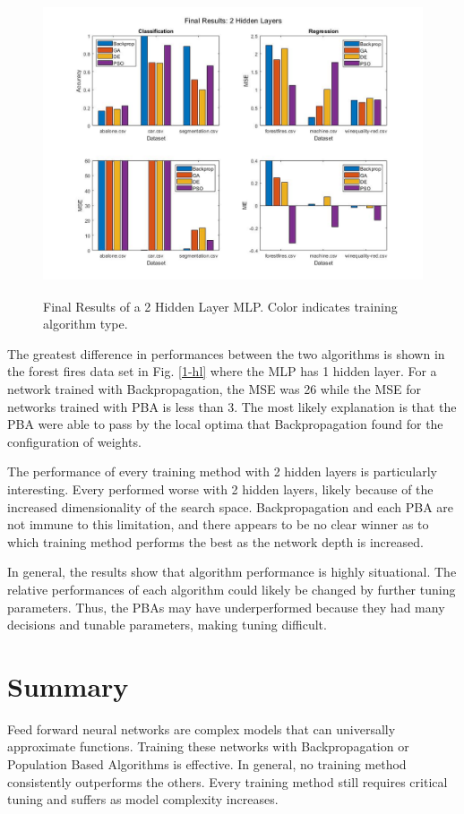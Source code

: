\documentclass[twoside,11pt]{article}
\begin{document}
	\begin{figure}[h]
		\centering
		\includegraphics[height=3.5in]{FINAL_FIGS/2_hl.jpg}
		\caption{Final Results of a 2 Hidden Layer MLP. Color indicates training algorithm type.}
		\label{2-hl}
	\end{figure}

	The greatest difference in performances between the two algorithms is shown in the forest fires data set in Fig. \ref{1-hl} where the MLP has 1 hidden layer. 
	For a network trained with Backpropagation, the MSE was 26 while the MSE for networks trained with PBA is less than 3. 
	The most likely explanation is that the PBA were able to pass by the local optima that Backpropagation found for the configuration of weights.
	
	The performance of every training method with 2 hidden layers is particularly interesting. Every performed worse with 2 hidden layers, likely because of the increased dimensionality of the search space. Backpropagation and each PBA are not immune to this limitation, and there appears to be no clear winner as to which training method performs the best as the network depth is increased.
	
	In general, the results show that algorithm performance is highly situational. The relative performances of each algorithm could likely be changed by further tuning parameters. Thus, the PBAs may have underperformed because they had many decisions and tunable parameters, making tuning difficult.
	

\section{Summary}

Feed forward neural networks are complex models that can universally approximate functions. Training these networks with Backpropagation or Population Based Algorithms is effective. In general, no training method consistently outperforms the others. Every training method still requires critical tuning and suffers as model complexity increases.

\newpage


\end{document}
